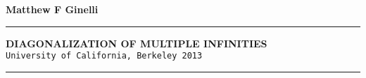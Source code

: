 \documentclass[a4paper,12pt]{article}
\newcommand{\titleline}[1]{\noindent\rule{\textwidth}{#1}}
\begin{document}
\vspace*{\fill}

\begin{center}

\textbf{Matthew F Ginelli}

\end{center}
\titleline{5pt}

\begin{center}
\bigskip
\textbf{DIAGONALIZATION OF MULTIPLE INFINITIES}\\
\smallskip
\texttt{University of California, Berkeley 2013}
\medskip
\end{center}

\titleline{5pt}
\vspace*{\fill}
\end{document}

